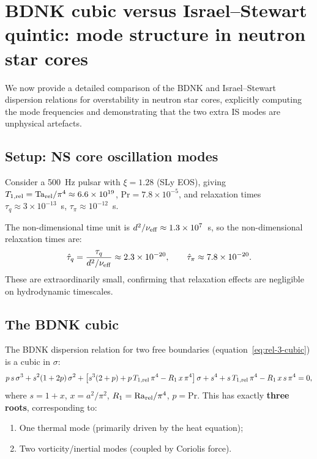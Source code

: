 
\section{BDNK cubic versus Israel--Stewart quintic: mode structure in
neutron star cores}\label{sec:rel-3-deep-bdnk-is}

We now provide a detailed comparison of the BDNK and Israel--Stewart
dispersion relations for overstability in neutron star cores, explicitly
computing the mode frequencies and demonstrating that the two extra
IS modes are unphysical artefacts.

\subsection{Setup: NS core oscillation modes}

Consider a 500~Hz pulsar with $\xi = 1.28$ (SLy EOS), giving
$T_{1,\rm rel} = \mathrm{Ta}_{\mathrm{rel}}/\pi^4 \approx 6.6 \times 10^{19}$,
$\mathrm{Pr} = 7.8 \times 10^{-5}$, and relaxation times
$\tau_q \approx 3\times 10^{-13}$~s,
$\tau_\pi \approx 10^{-12}$~s.

The non-dimensional time unit is $d^2/\nu_{\rm eff} \approx 1.3 \times 10^7$~s,
so the non-dimensional relaxation times are:
\begin{equation}
  \hat\tau_q = \frac{\tau_q}{d^2/\nu_{\rm eff}} \approx 2.3 \times 10^{-20},
  \qquad
  \hat\tau_\pi \approx 7.8 \times 10^{-20}.
\end{equation}
These are extraordinarily small, confirming that relaxation effects
are negligible on hydrodynamic timescales.

\subsection{The BDNK cubic}

The BDNK dispersion relation for two free boundaries
(equation~\eqref{eq:rel-3-cubic}) is a cubic in $\sigma$:
\begin{equation}
  p\,s\,\sigma^3
  + s^2(1 + 2p)\,\sigma^2
  + \bigl[s^3(2+p) + p\,T_{1,\rm rel}\,\pi^4 - R_1\,x\,\pi^4\bigr]\,\sigma
  + s^4 + s\,T_{1,\rm rel}\,\pi^4 - R_1\,x\,s\,\pi^4
  = 0,
\end{equation}
where $s = 1 + x$, $x = a^2/\pi^2$, $R_1 = \mathrm{Ra}_{\mathrm{rel}}/\pi^4$,
$p = \mathrm{Pr}$.  This has exactly \textbf{three roots},
corresponding to:
\begin{enumerate}
  \item One thermal mode (primarily driven by the heat equation);
  \item Two vorticity/inertial modes (coupled by Coriolis force).
\end{enumerate}

